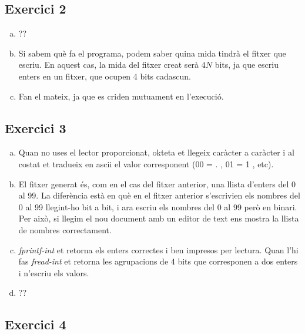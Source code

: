 \documentclass[catalan, a4, 12pt]{article}
\begin{document}
\subsection*{Exercici 2}

\begin{enumerate}[(a)]
    \item ??
    
    \item Si sabem què fa el programa, podem saber quina mida tindrà el fitxer que escriu. En aquest cas, la mida del fitxer creat serà $4N$ bits, ja que escriu enters en un fitxer, que ocupen 4 bits cadascun.
    
    \item Fan el mateix, ja que es criden mutuament en l'execució.
\end{enumerate}

\subsection*{Exercici 3}

\begin{enumerate}[(a)]
    \item Quan no uses el lector proporcionat, okteta et llegeix caràcter a caràcter i al costat et tradueix en ascii el valor corresponent (00 = . , 01 = 1 , etc).
    
    \item El fitxer generat és, com en el cas del fitxer anterior, una llista d'enters del 0 al 99. La diferència està en què en el fitxer anterior s'escrivien els nombres del 0 al 99 llegint-ho bit a bit, i ara escriu els nombres del 0 al 99 però en binari. Per això, si llegim el nou document amb un editor de text ens mostra la llista de nombres correctament.
    
    \item \textit{fprintf-int} et retorna els enters correctes i ben impresos per lectura. Quan l’hi fas \textit{fread-int} et retorna les agrupacions de 4 bits que corresponen a dos enters i n'escriu els valors.
    
    \item ??
\end{enumerate}

\subsection*{Exercici 4}
\end{document}
